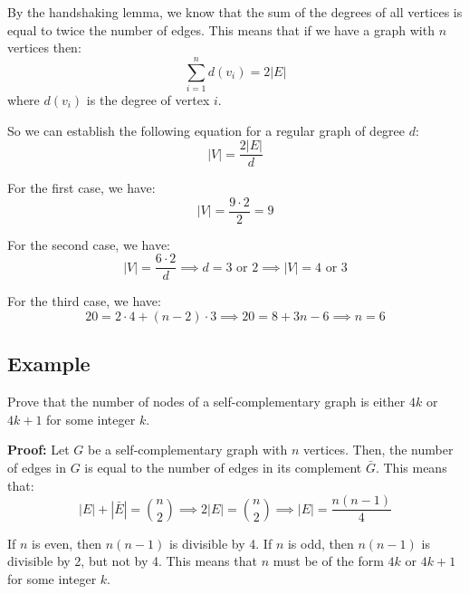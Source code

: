 \documentclass[11pt]{article}
\begin{document}
By the handshaking lemma, we know that the sum of the degrees of all vertices is equal to twice the number of edges. This means that if we have a graph with $n$ vertices then:
\[
\sum_{i=1}^{n} d(v_i) = 2 |E| 
\]
where $d(v_i)$ is the degree of vertex $i$.

So we can establish the following equation for a regular graph of degree $d$:
\[
|V| = \frac{2 |E|}{d}
\]

For the first case, we have:
\[
|V| = \frac{9 \cdot 2}{2} = 9
\]

For the second case, we have:
\[
|V| = \frac{6 \cdot 2}{d} \implies d = 3 \text{ or } 2 \implies |V| = 4 \text{ or } 3
\]

For the third case, we have:
\[
20 = 2 \cdot 4 + (n-2) \cdot 3 \implies 20 = 8 + 3n - 6 \implies n = 6  
\]

\subsection*{Example}
Prove that the number of nodes of a self-complementary graph is either $4k$ or $4k + 1$ for some integer $k$.

\textbf{Proof:} Let $G$ be a self-complementary graph with $n$ vertices. Then, the number of edges in $G$ is equal to the number of edges in its complement $\bar{G}$. This means that:
\[
|E| + |\bar{E}| = \binom{n}{2} \implies 2 |E| = \binom{n}{2} \implies |E| = \frac{n(n-1)}{4}
\]

If $n$ is even, then $n(n-1)$ is divisible by 4. If $n$ is odd, then $n(n-1)$ is divisible by 2, but not by 4. This means that $n$ must be of the form $4k$ or $4k + 1$ for some integer $k$.
\end{document}
